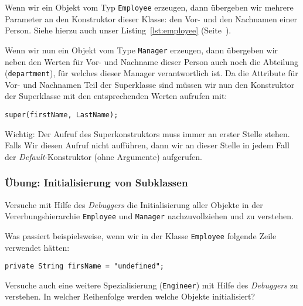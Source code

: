 \begin{Exercise}[%
title={Verwalten von Studenten und Kursbelegungen},
label={ex:course}]
Wenn wir ein Objekt vom Typ \texttt{Employee} erzeugen, dann übergeben wir mehrere Parameter
an den Konstruktor dieser Klasse: den Vor- und den Nachnamen einer Person. Siehe hierzu
auch unser Listing~\ref{lst:employee} (Seite~\pageref{lst:employee}).

Wenn wir nun ein Objekt vom Type \texttt{Manager} erzeugen, dann übergeben wir neben den
Werten für Vor- und Nachname dieser Person auch noch die Abteilung (\texttt{department}), für
welches dieser Manager verantwortlich ist. Da die Attribute für Vor- und Nachnamen Teil
der Superklasse sind müssen wir nun den Konstruktor der Superklasse mit den entsprechenden
Werten aufrufen mit:

\texttt{super(firstName, LastName);}

Wichtig: Der Aufruf des Superkonstruktors muss immer an erster Stelle stehen. Falls
Wir diesen Aufruf nicht aufführen, dann wir an dieser Stelle in jedem Fall der
\emph{Default}-Konstruktor (ohne Argumente) aufgerufen.

\begin{Exercise}[%
title={Initialisierung von Subklassen},
label={ex:init-subclasses}]

    \begin{frame}[fragile]
        \frametitle<presentation>{Übung: Initialisierung von Subklassen}
        Versuche mit Hilfe des \emph{Debuggers} die Initialisierung aller Objekte in der
        Vererbungshierarchie \texttt{Employee} und \texttt{Manager} nachzuvollziehen und
        zu verstehen.

        Was passiert beispielsweise, wenn wir in der Klasse \texttt{Employee} folgende
        Zeile verwendet hätten:

        \texttt{private String firsName = "undefined";}
    \end{frame}

    Versuche auch eine weitere Spezialisierung (\texttt{Engineer}) mit Hilfe des
    \emph{Debuggers} zu verstehen. In welcher Reihenfolge werden welche Objekte initialisiert?

\end{Exercise}




\end{Exercise}
